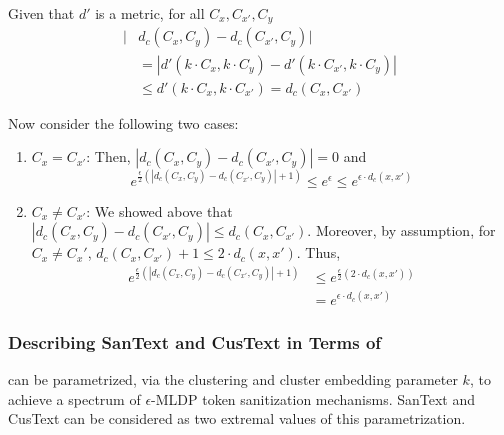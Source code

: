 
\noindent
Given that $d'$ is a metric, for all $C_x, C_{x'}, C_y$
\begin{align*}
    |&d_c(C_x, C_y) - d_c(C_{x'}, C_y)| \\
    &= |d'(k \cdot C_x, k\cdot C_y) - d'(k \cdot C_{x'}, k \cdot C_y)|\\
    &\leq d'(k \cdot C_x, k\cdot C_{x'}) = d_c(C_x, C_{x'})
\end{align*}

\noindent

\noindent
Now consider the following two cases:
\begin{enumerate}
\setlength\itemsep{0em}
    \item $C_x = C_{x'}$: Then, $|d_c(C_x, C_y) - d_c(C_{x'}, C_y)| = 0$ and $$e^{\frac{\epsilon}{2}(|d_c(C_x, C_y) - d_c(C_{x'},C_y)| +1)} \leq e^\epsilon \leq e^{\epsilon\cdot d_c(x, x')}$$ 
    \item $C_x \not= C_{x'}$: We showed above that  $|d_c(C_x, C_y) - d_c(C_{x'}, C_y)| \leq d_c(C_x, C_{x'})$. Moreover, by assumption, for $C_x \not= C_x'$, $d_c(C_x, C_{x'}) + 1 \leq 2\cdot d_c(x, x')$. 
    Thus, 
    \begin{align*}
        e^{\frac{\epsilon}{2}(|d_c(C_x, C_y) - d_c(C_{x'}, C_y)| +1)} &\leq e^{\frac{\epsilon}{2}(2\cdot d_c(x, x'))}\\
        &=e^{\epsilon\cdot d_c(x, x')}
    \end{align*} 
\end{enumerate}

\subsubsection{Describing SanText and CusText in Terms of \clusant}\label{sec:prev_work_wrt_clusant}
\clusant can be parametrized, via the clustering and cluster embedding parameter $k$, to achieve a spectrum of $\epsilon$-MLDP token sanitization mechanisms. SanText and CusText can be considered as two extremal values of this parametrization.

